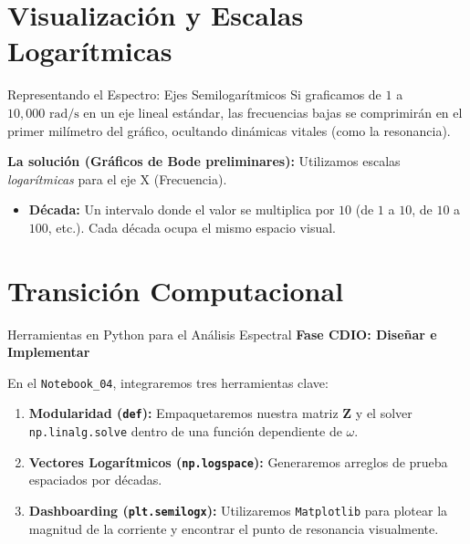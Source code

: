 \documentclass[aspectratio=169]{beamer}
\begin{document}
\section{Visualización y Escalas Logarítmicas}
\begin{frame}{Representando el Espectro: Ejes Semilogarítmicos}
    Si graficamos de $1$ a $10,000\text{ rad/s}$ en un eje lineal estándar, las frecuencias bajas se comprimirán en el primer milímetro del gráfico, ocultando dinámicas vitales (como la resonancia).
    
    \vspace{0.3cm}
    \textbf{La solución (Gráficos de Bode preliminares):}
    Utilizamos escalas \textit{logarítmicas} para el eje X (Frecuencia).
    \begin{itemize}
        \item \textbf{Década:} Un intervalo donde el valor se multiplica por $10$ (de $1$ a $10$, de $10$ a $100$, etc.). Cada década ocupa el mismo espacio visual.
    \end{itemize}
\end{frame}

\section{Transición Computacional}
\begin{frame}{Herramientas en Python para el Análisis Espectral}
    \textbf{Fase CDIO: Diseñar e Implementar}
    
    En el \texttt{Notebook\_04}, integraremos tres herramientas clave:
    \begin{enumerate}
        \item \textbf{Modularidad (\texttt{def}):} Empaquetaremos nuestra matriz $\mathbf{Z}$ y el solver \texttt{np.linalg.solve} dentro de una función dependiente de $\omega$.
        \item \textbf{Vectores Logarítmicos (\texttt{np.logspace}):} Generaremos arreglos de prueba espaciados por décadas.
        \item \textbf{Dashboarding (\texttt{plt.semilogx}):} Utilizaremos \texttt{Matplotlib} para plotear la magnitud de la corriente y encontrar el punto de resonancia visualmente.
    \end{enumerate}
\end{frame}
\end{document}
